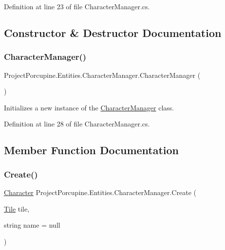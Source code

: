 Definition at line 23 of file Character\+Manager.\+cs.



\subsection{Constructor \& Destructor Documentation}
\mbox{\label{class_project_porcupine_1_1_entities_1_1_character_manager_ab14467714097458d428428ee18fe6a76}} 
\subsubsection{\texorpdfstring{Character\+Manager()}{CharacterManager()}}
{\footnotesize\ttfamily Project\+Porcupine.\+Entities.\+Character\+Manager.\+Character\+Manager (\begin{DoxyParamCaption}{ }\end{DoxyParamCaption})}



Initializes a new instance of the \hyperlink{class_project_porcupine_1_1_entities_1_1_character_manager}{Character\+Manager} class. 



Definition at line 28 of file Character\+Manager.\+cs.



\subsection{Member Function Documentation}
\mbox{\label{class_project_porcupine_1_1_entities_1_1_character_manager_ae0f5194163caf61bbc59dc263fbd4e8b}} 
\subsubsection{\texorpdfstring{Create()}{Create()}\hspace{0.1cm}{\footnotesize\ttfamily [1/2]}}
{\footnotesize\ttfamily \hyperlink{class_project_porcupine_1_1_entities_1_1_character}{Character} Project\+Porcupine.\+Entities.\+Character\+Manager.\+Create (\begin{DoxyParamCaption}\item[{\hyperlink{class_tile}{Tile}}]{tile,  }\item[{string}]{name = {\ttfamily null} }\end{DoxyParamCaption})}



